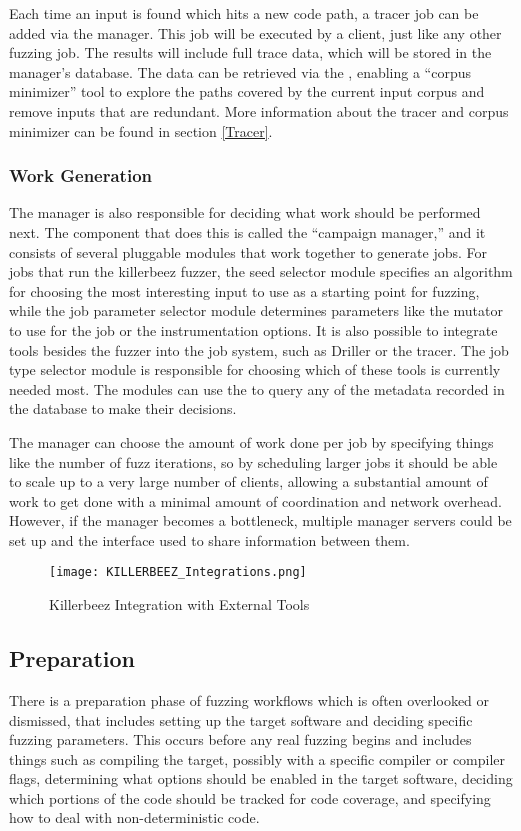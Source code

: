 Each time an input
is found which hits a new code path, a tracer job can be added via the manager.
This job will be executed by a \BOINC{} client, just like any other fuzzing job.
The results will include full trace data, which will be stored in the manager's
database.  The data can be retrieved via the \REST{} \API{}, enabling a ``corpus
minimizer'' tool to explore the paths covered by the current input corpus and
remove inputs that are redundant. More
information about the tracer and corpus minimizer can be found in section
\ref{Tracer}.

\subsubsection{Work Generation}
The manager is also responsible for deciding what work should be performed next.
The component that does this is called the ``campaign manager,'' and it consists
of several pluggable modules that work together to generate jobs. For
jobs that run the killerbeez fuzzer, the seed selector module specifies an
algorithm for choosing the most interesting input to use as a starting point for
fuzzing, while the job parameter selector module determines parameters like the
mutator to use for the job or the instrumentation options. It is also possible
to integrate tools besides the fuzzer into the job system, such as Driller or
the tracer. The job type selector module is responsible for choosing which of
these tools is currently needed most. The modules can use the \REST{} \API{} to
query any of the metadata recorded in the database to make their decisions.

The manager can choose the amount of work done per job by specifying things like the
number of fuzz iterations, so by scheduling larger jobs it should be able to scale up to a very large number
of clients, allowing a substantial amount of
work to get done with a minimal amount of coordination and network overhead.
However, if the manager becomes a bottleneck, multiple
manager servers could be set up and the \REST{} \API{} interface used to share
information between them.

\begin{figure*}[!ht]
\centering
\texttt{[image: KILLERBEEZ\_Integrations.png]}
\caption{Killerbeez Integration with External Tools}
\label{fig:Killerbeez-integrations}
\end{figure*}


\subsection{Preparation}  \label{Preparation Overview}
There is a preparation phase of fuzzing workflows which is often overlooked or
dismissed, that includes setting up the target software and deciding specific
fuzzing parameters. This occurs before any real fuzzing begins and includes
things such as compiling the target, possibly with a specific compiler or
compiler flags, determining what options should be enabled in the target
software, deciding which portions of the code should be tracked for code
coverage, and specifying how to deal with non-deterministic code.

